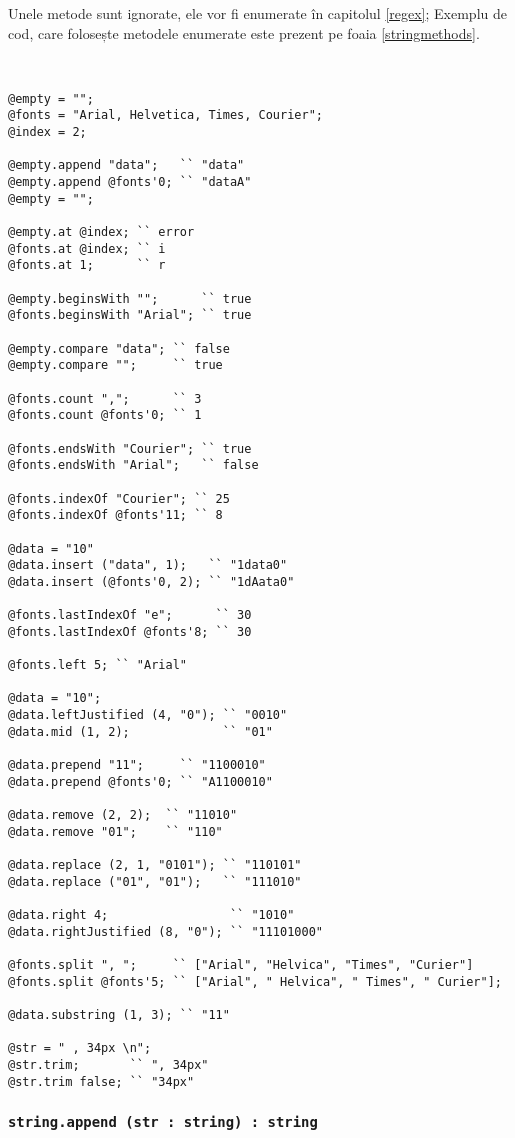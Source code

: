 Unele metode sunt ignorate, ele vor fi enumerate în capitolul \ref{regex}; Exemplu de cod, care folosește metodele enumerate este prezent pe foaia \ref{stringmethods}.

\

\begin{lstlisting}[caption=Metodele clasei string, label=stringmethods]
@empty = "";
@fonts = "Arial, Helvetica, Times, Courier";
@index = 2;

@empty.append "data";   `` "data"
@empty.append @fonts'0; `` "dataA"
@empty = "";

@empty.at @index; `` error
@fonts.at @index; `` i
@fonts.at 1;	  `` r

@empty.beginsWith "";      `` true
@fonts.beginsWith "Arial"; `` true

@empty.compare "data"; `` false
@empty.compare "";     `` true

@fonts.count ",";      `` 3
@fonts.count @fonts'0; `` 1

@fonts.endsWith "Courier"; `` true
@fonts.endsWith "Arial";   `` false

@fonts.indexOf "Courier"; `` 25
@fonts.indexOf @fonts'11; `` 8

@data = "10"
@data.insert ("data", 1);   `` "1data0"
@data.insert (@fonts'0, 2); `` "1dAata0"

@fonts.lastIndexOf "e";      `` 30
@fonts.lastIndexOf @fonts'8; `` 30

@fonts.left 5; `` "Arial"

@data = "10";
@data.leftJustified (4, "0"); `` "0010"
@data.mid (1, 2);             `` "01"

@data.prepend "11";     `` "1100010"
@data.prepend @fonts'0; `` "A1100010"

@data.remove (2, 2);  `` "11010"
@data.remove "01";    `` "110"

@data.replace (2, 1, "0101"); `` "110101"
@data.replace ("01", "01");   `` "111010"

@data.right 4; 				   `` "1010"
@data.rightJustified (8, "0"); `` "11101000"

@fonts.split ", ";     `` ["Arial", "Helvica", "Times", "Curier"]
@fonts.split @fonts'5; `` ["Arial", " Helvica", " Times", " Curier"];

@data.substring (1, 3); `` "11"

@str = " , 34px \n";
@str.trim;       `` ", 34px"
@str.trim false; `` "34px"
\end{lstlisting}

\subsubsection{\lstinline|string.append (str : string) : string|}

